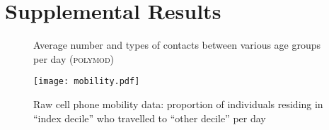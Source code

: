 \documentclass{article}
\begin{document}
  \section{Supplemental Results}
  \begin{figure}[h]
    \centering
    \caption{Average number and types of contacts between various age groups per day (\textsc{polymod})}
    \label{fig:polymod}
  \end{figure}
  \begin{figure}[h]
    \centering
    \texttt{[image: mobility.pdf]}
    \caption{Raw cell phone mobility data:
      proportion of individuals residing in ``index decile'' who travelled to ``other decile'' per day}
    \label{fig:mobility}
  \end{figure}
\end{document}
